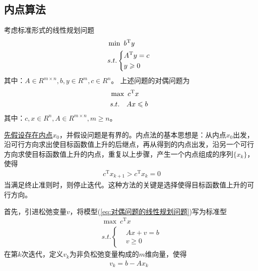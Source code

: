     \subsection{内点算法}
        \par
        考虑标准形式的线性规划问题
        \begin{align}
        \label{eq:标准形式的线性规划问题}
        & \mathop {\min}\  b^\mathrm{T} y\\
        & s.t.\left\{
        \begin{aligned}
        & A^\mathrm{T} y = c\\\notag
        & y \geqslant 0\notag
        \end{aligned}
        \right.
        \end{align}
        其中：$A \in R^{m\times n},b,y \in R^m,c \in R^n$。
        上述问题的对偶问题为
        \begin{align}
        \label{eq:对偶问题的线性规划问题}
        & \mathop {\max}\  c^\mathrm{T} x\\
        & s.t.\quad Ax \leqslant b\notag
        \end{align}
        其中：$c,x \in R^n , A \in R^{m\times n},m \geqslant n$。
        \par
        \underline{先假设存在内点$x_0$}，并假设问题是有界的。内点法的基本思想是：从内点$x_0$出发，沿可行方向求出使目标函数值上升的后继点，再从得到的内点出发，沿另一个可行方向求使目标函数值上升的内点，重复以上步骤，产生一个内点组成的序列$\{x_k\}$，使得
        \begin{align*}
        &c^\mathrm{T} x_{k+1} > c^\mathrm{T} x_k=0
        \end{align*}
        当满足终止准则时，则停止迭代。这种方法的关键是选择使得目标函数值上升的可行方向。
        \par
        首先，引进松弛变量$v$，将模型(\ref{eq:对偶问题的线性规划问题})写为标准型
        \begin{align*}
        &\mathop {\max}\  c^\mathrm{T} x\\
        &s.t.\left\{
        \begin{aligned}
        & Ax + v = b \\
        & v \geqslant 0
        \end{aligned}
        \right.
        \end{align*}
        在第$k$次迭代，定义$v_k$为非负松弛变量构成的$m$维向量，使得
        \begin{align*}
        v_k = b - Ax_k
        \end{align*}
